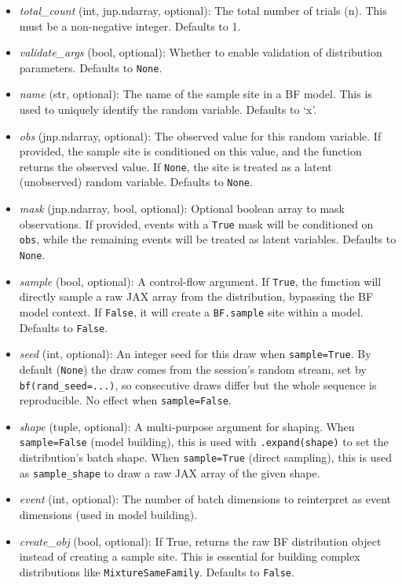 \documentclass[
  letterpaper,
  DIV=11,
  numbers=noendperiod]{scrartcl}
\begin{document}
\begin{itemize}
\item
  \emph{total\_count} (int, jnp.ndarray, optional): The total number of
  trials (n). This must be a non-negative integer. Defaults to 1.
\item
  \emph{validate\_args} (bool, optional): Whether to enable validation
  of distribution parameters. Defaults to \texttt{None}.
\item
  \emph{name} (str, optional): The name of the sample site in a BF
  model. This is used to uniquely identify the random variable. Defaults
  to `x'.
\item
  \emph{obs} (jnp.ndarray, optional): The observed value for this random
  variable. If provided, the sample site is conditioned on this value,
  and the function returns the observed value. If \texttt{None}, the
  site is treated as a latent (unobserved) random variable. Defaults to
  \texttt{None}.
\item
  \emph{mask} (jnp.ndarray, bool, optional): Optional boolean array to
  mask observations. If provided, events with a \texttt{True} mask will
  be conditioned on \texttt{obs}, while the remaining events will be
  treated as latent variables. Defaults to \texttt{None}.
\item
  \emph{sample} (bool, optional): A control-flow argument. If
  \texttt{True}, the function will directly sample a raw JAX array from
  the distribution, bypassing the BF model context. If \texttt{False},
  it will create a \texttt{BF.sample} site within a model. Defaults to
  \texttt{False}.
\item
  \emph{seed} (int, optional): An integer seed for this draw when
  \texttt{sample=True}. By default (\texttt{None}) the draw comes from
  the session's random stream, set by \texttt{bf(rand\_seed=...)}, so
  consecutive draws differ but the whole sequence is reproducible. No
  effect when \texttt{sample=False}.
\item
  \emph{shape} (tuple, optional): A multi-purpose argument for shaping.
  When \texttt{sample=False} (model building), this is used with
  \texttt{.expand(shape)} to set the distribution's batch shape. When
  \texttt{sample=True} (direct sampling), this is used as
  \texttt{sample\_shape} to draw a raw JAX array of the given shape.
\item
  \emph{event} (int, optional): The number of batch dimensions to
  reinterpret as event dimensions (used in model building).
\item
  \emph{create\_obj} (bool, optional): If True, returns the raw BF
  distribution object instead of creating a sample site. This is
  essential for building complex distributions like
  \texttt{MixtureSameFamily}. Defaults to \texttt{False}.
\end{itemize}
\end{document}
